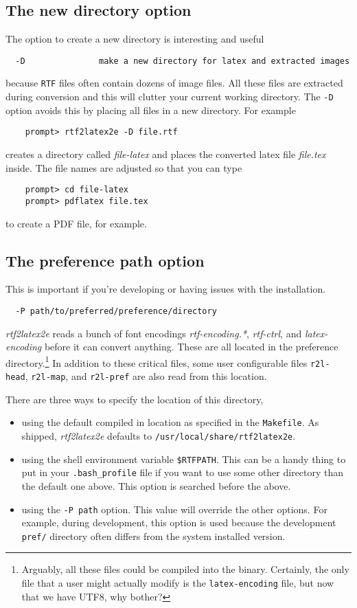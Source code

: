 \documentclass{article}
\def\rtf2latex2e{{\it rtf2latex2e}}
\begin{document}
\subsection{The new directory option}
The option to create a new directory is interesting and useful
\begin{verbatim}
  -D               make a new directory for latex and extracted images
\end{verbatim}
because \texttt{RTF} files often contain dozens of image files.
All these files are extracted during conversion and this will clutter
your current working directory.  The \texttt{-D} option avoids this by
placing all files in a new directory.  For example
\begin{verbatim}
    prompt> rtf2latex2e -D file.rtf
\end{verbatim}
creates a directory called \textit{file-latex} and places the converted
latex file \textit{file.tex} inside.  The file names are adjusted so that
you can type 
\begin{verbatim}
    prompt> cd file-latex
    prompt> pdflatex file.tex
\end{verbatim}
to create a PDF file, for example.

\subsection{The preference path option}
This is important if you're developing or having issues with the installation.
\begin{verbatim}
  -P path/to/preferred/preference/directory
\end{verbatim}
\rtf2latex2e{}
reads a bunch of font encodings \textit{rtf-encoding.*}, \textit{rtf-ctrl}, and
\textit{latex-encoding} before it can convert anything.  These are all located
in the preference directory.\footnote{Arguably, all these files could be compiled
into the binary.  Certainly, the only file that a user might actually modify 
is the \texttt{latex-encoding} file, but now that we have UTF8, why bother?} 
In addition to these critical files, some user configurable files \texttt{r2l-head},
\texttt{r2l-map}, and \texttt{r2l-pref} are also read from this location.

There are three ways to specify the location of this directory, 
\begin{itemize}
\item
using the default compiled in location as specified in the \texttt{Makefile}.  As
shipped, \rtf2latex2e{} defaults to \texttt{/usr/local/share/rtf2latex2e}.
\item
using the shell environment variable \texttt{\$RTFPATH}.  This can be a handy thing
to put in your \texttt{.bash\_profile} file if you want to use some other directory
than the default one above.  This option is searched before the above.
\item
using the \texttt{-P path} option.  This value will override the other options.  For example, during
development, this option is used because the development \texttt{pref/}
directory often differs from the system installed version.
\end{itemize}
\end{document}
